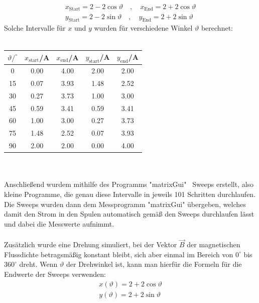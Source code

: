 \documentclass[german,  %
parskip=full,  %
]{scrartcl}
\begin{document}
\begin{align*}
x_{\mathrm{Start}} = 2 - 2\cos\vartheta \quad , \quad x_{\mathrm{End}} = 2 + 2\cos\vartheta \\
y_{\mathrm{Start}} = 2 - 2\sin\vartheta \quad , \quad y_{\mathrm{End}} = 2 + 2\sin\vartheta 
\end{align*}
Solche Intervalle für \(x\) und \(y\) wurden für verschiedene Winkel \(\vartheta\) berechnet: \\\\
\begin{table}[h!]
\centering
\begin{tabular}{|c|c|c|c|c|} \hline
$\vartheta / ^{\circ}$ & $x_{\text{start}}$/A & $x_{\text{end}}$/A & $y_{\text{start}}$/A & $y_{\text{end}}$/A \\\hline
0  & 0.00 & 4.00 & 2.00 & 2.00 \\\hline
15 & 0.07 & 3.93 & 1.48 & 2.52 \\\hline
30 & 0.27 & 3.73 & 1.00 & 3.00 \\\hline
45 & 0.59 & 3.41 & 0.59 & 3.41 \\\hline
60 & 1.00 & 3.00 & 0.27 & 3.73 \\\hline
75 & 1.48 & 2.52 & 0.07 & 3.93 \\\hline
90 & 2.00 & 2.00 & 0.00 & 4.00  \\\hline
\end{tabular}
\end{table} \\\\
Anschließend wurdem mithilfe des Programms "matrixGui" \ Sweeps erstellt, also kleine Programme, die genau diese Intervalle in jeweils 101 Schritten durchlaufen. Die Sweeps wurden dann dem Messprogramm "matrixGui" übergeben, welches damit den Strom in den Spulen automatisch gemäß den Sweeps durchlaufen lässt und dabei die Messwerte aufnimmt. \\\\
Zusätzlich wurde eine Drehung simuliert, bei der Vektor \(\vec{B}\) der magnetischen Flussdichte betragsmäßig konstant bleibt, sich aber einmal im Bereich von \(0^{\circ}\) bis \(360^{\circ}\) dreht. Wenn \(\vartheta\) der Drehwinkel ist, kann man hierfür die Formeln für die Endwerte der Sweeps verwenden:
\begin{align*}
x(\vartheta) = 2 + 2\cos\vartheta \\
y(\vartheta) = 2 + 2\sin\vartheta 
\end{align*}
\end{document}
